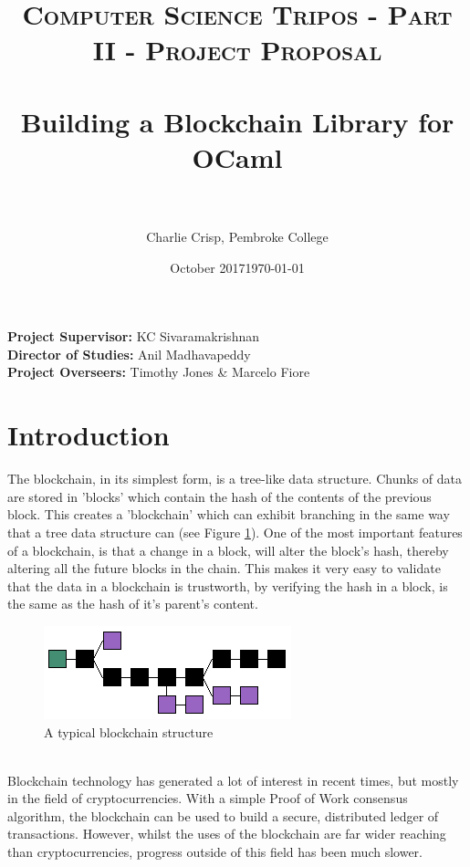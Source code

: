 \documentclass[12pt, letterpaper, twoside]{article}
\author{Charlie Crisp, Pembroke College }
\date{October 2017}
\title{	
	\normalfont \normalsize 
	\textsc{Computer Science Tripos - Part II - Project Proposal} \\ [25pt]
	\horrule{0.5pt} \\[0.4cm] %
	\huge Building a Blockchain Library for OCaml\\ %
	\horrule{2pt} \\[0.5cm] %
}
\date{\normalsize\today} %
\begin{document}
	
	\maketitle
	
	\noindent \textbf{Project Supervisor:} KC Sivaramakrishnan \\
	\textbf{Director of Studies:} Anil Madhavapeddy \\
	\textbf{Project Overseers:} Timothy Jones \& Marcelo Fiore\\
	
	\section*{Introduction}
	
	The blockchain, in its simplest form, is a tree-like data structure. Chunks of data are stored in 'blocks' which contain the hash of the contents of the previous block. This creates a 'blockchain' which can exhibit branching in the same way that a tree data structure can (see Figure \ref{fig:blockchain}). One of the most important features of a blockchain, is that a change in a block, will alter the block's hash, thereby altering all the future blocks in the chain. This makes it very easy to validate that the data in a blockchain is trustworth, by verifying the hash in a block, is the same as the hash of it's parent's content.
	\begin{figure}
		\includegraphics[width=\linewidth]{blockchain}
		\caption{A typical blockchain structure \cite{Blockchain Image}}
		\label{fig:blockchain}
	\end{figure}
	\\
	\noindent Blockchain technology has generated a lot of interest in recent times, but mostly in the field of cryptocurrencies.
	With a simple Proof of Work consensus algorithm, the blockchain can be used to build a secure, distributed ledger of transactions. However, whilst the uses of the blockchain are far wider reaching than cryptocurrencies, progress outside of this field has been much slower. 
\end{document}
